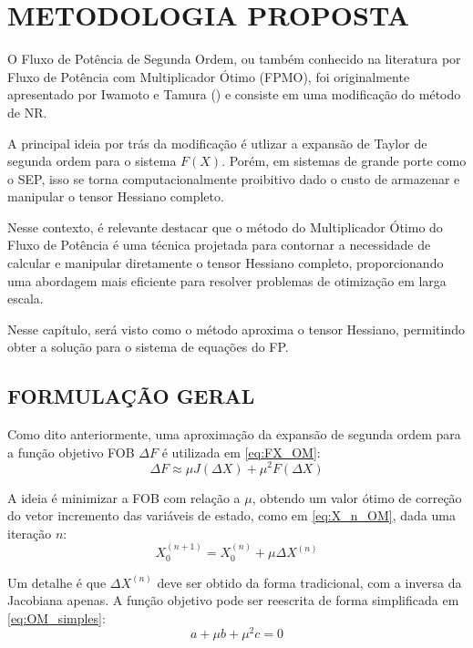 \chapter{METODOLOGIA PROPOSTA}\label{cap:cap3}
O Fluxo de Potência de Segunda Ordem, ou também conhecido na literatura por Fluxo de Potência com Multiplicador Ótimo (\ac{FPMO}), foi originalmente apresentado por Iwamoto e Tamura (\citeyear{iwamoto1981load}) e consiste em uma modificação do método de \acs{NR}.

A principal ideia por trás da modificação é utlizar a expansão de Taylor de segunda ordem para o sistema $F(X)$.
Porém, em sistemas de grande porte como o \acs{SEP}, isso se torna computacionalmente proibitivo dado o custo de armazenar e manipular o tensor Hessiano completo. 

Nesse contexto, é relevante destacar que o método do Multiplicador Ótimo do Fluxo de Potência é uma técnica projetada para contornar a necessidade de calcular e manipular diretamente o tensor Hessiano completo, proporcionando uma abordagem mais eficiente para resolver problemas de otimização em larga escala.

Nesse capítulo, será visto como o método aproxima o tensor Hessiano, permitindo obter a solução para o sistema de equações do \acs{FP}.

\section{FORMULAÇÃO GERAL}

Como dito anteriormente, uma aproximação da expansão de segunda ordem para a função objetivo \ac{FOB} $\Delta F$ é utilizada em \eqref{eq:FX_OM}:
\begin{equation}\label{eq:FX_OM}
    \Delta F \approx \mu J (\Delta X) + \mu^2F(\Delta X)
\end{equation}


A ideia é minimizar a \ac{FOB} com relação a $\mu$, obtendo um valor ótimo de correção do vetor incremento das variáveis de estado, como em \eqref{eq:X_n_OM},  dada uma iteração $n$:
\begin{equation}\label{eq:X_n_OM}
    X_0^{(n+1)} = X_0^{(n)} + \mu \Delta X^{(n)}
\end{equation}

Um detalhe é que $\Delta X^{(n)}$ deve ser obtido da forma tradicional, com a inversa da Jacobiana apenas.
A função objetivo pode ser reescrita de forma simplificada em \eqref{eq:OM_simples}:
\begin{equation}\label{eq:OM_simples}
    a + \mu b + \mu^2c = 0
\end{equation}

